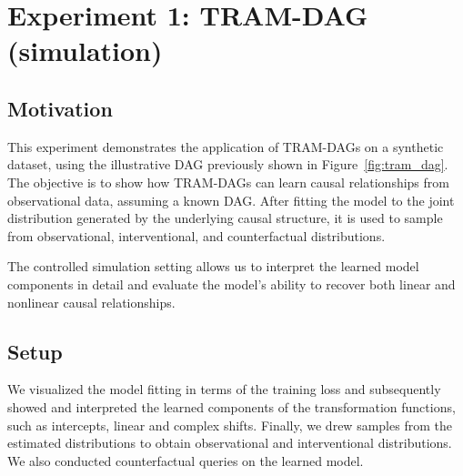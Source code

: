 




\chapter{Experiment 1: TRAM-DAG (simulation)}




\section{Motivation}

This experiment demonstrates the application of TRAM-DAGs on a synthetic dataset, using the illustrative DAG previously shown in Figure~\ref{fig:tram_dag}. The objective is to show how TRAM-DAGs can learn causal relationships from observational data, assuming a known DAG. After fitting the model to the joint distribution generated by the underlying causal structure, it is used to sample from observational, interventional, and counterfactual distributions.

The controlled simulation setting allows us to interpret the learned model components in detail and evaluate the model’s ability to recover both linear and nonlinear causal relationships.






\section{Setup} \label{sec:methods_experiment1}

We visualized the model fitting in terms of the training loss and subsequently showed and interpreted the learned components of the transformation functions, such as intercepts, linear and complex shifts. Finally, we drew samples from the estimated distributions to obtain observational and interventional distributions. We also conducted counterfactual queries on the learned model.

